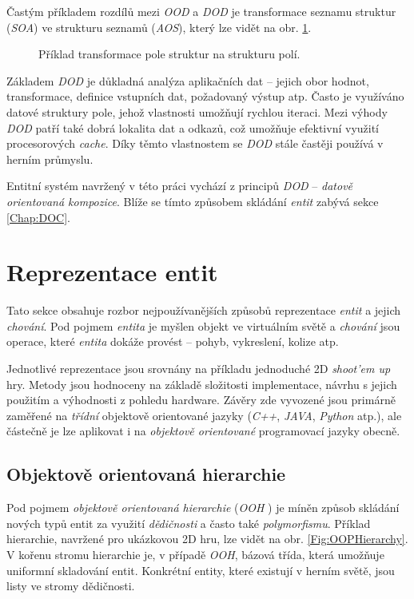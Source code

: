 Častým příkladem rozdílů mezi \emph{OOD} a \emph{DOD} je transformace seznamu struktur (\emph{SOA}) ve strukturu seznamů (\emph{AOS}), který lze vidět na obr. \ref{Fig:SOAASO}.

\begin{figure}[]
	\caption{Příklad transformace pole struktur na strukturu polí.}
	\label{Fig:SOAASO}
\end{figure}

Základem \emph{DOD} je důkladná analýza aplikačních dat -- jejich obor hodnot, transformace, definice vstupních dat, požadovaný výstup atp. Často je využíváno datové struktury pole, jehož vlastnosti umožňují rychlou iteraci. Mezi výhody \emph{DOD} patří také dobrá lokalita dat a odkazů, což umožňuje efektivní využití procesorových \emph{cache}. Díky těmto vlastnostem se \emph{DOD} stále častěji používá v herním průmyslu\cite{DataOrientedDesignDice}\cite{DataOrientedDesignCppCon}.

Entitní systém navržený v této práci vychází z principů \emph{DOD} -- \emph{datově orientovaná kompozice}\cite{DODComponents}. Blíže se tímto způsobem skládání \emph{entit} zabývá sekce \ref{Chap:DOC}.

\section{Reprezentace entit}

Tato sekce obsahuje rozbor nejpoužívanějších způsobů reprezentace \emph{entit}\cite{EvolveHierarchy} a jejich \emph{chování}. Pod pojmem \emph{entita} je myšlen objekt ve virtuálním světě a \emph{chování} jsou operace, které \emph{entita} dokáže provést -- pohyb, vykreslení, kolize atp.

Jednotlivé reprezentace jsou srovnány na příkladu jednoduché 2D \emph{shoot'em up} hry. Metody jsou hodnoceny na základě složitosti implementace, návrhu s jejich použitím a výhodnosti z pohledu hardware. Závěry zde vyvozené jsou primárně zaměřené na \emph{třídní} objektově orientované jazyky (\emph{C++}, \emph{JAVA}, \emph{Python} atp.), ale částečně je lze aplikovat i na \emph{objektově orientované} programovací jazyky obecně.

\subsection{Objektově orientovaná hierarchie}

Pod pojmem \emph{objektově orientovaná hierarchie} (\emph{OOH} \cite{GameDesignPatterns}) je míněn způsob skládání nových typů entit za využití \emph{dědičnosti} a často také \emph{polymorfismu}. Příklad hierarchie, navržené pro ukázkovou 2D hru, lze vidět na obr. \ref{Fig:OOPHierarchy}. V kořenu stromu hierarchie je, v případě \emph{OOH}, bázová třída, která umožňuje uniformní skladování entit. Konkrétní entity, které existují v herním světě, jsou listy ve stromy dědičnosti.


